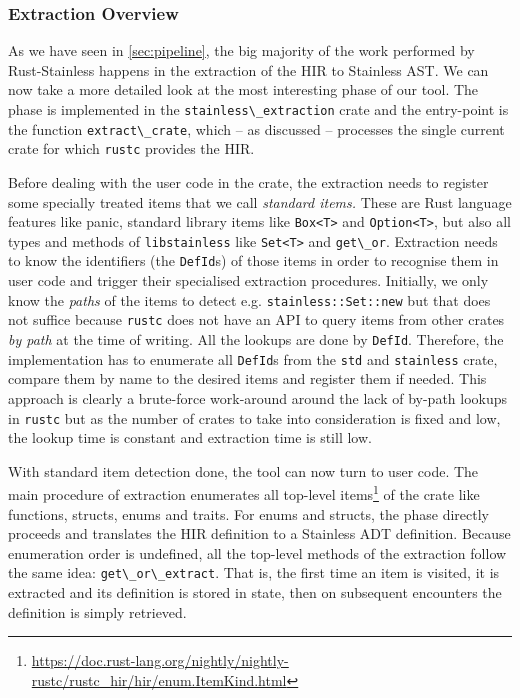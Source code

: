 \subsubsection{Extraction Overview}
\label{sec:extraction-overview}

As we have seen in \autoref{sec:pipeline}, the big majority of the work
performed by Rust-Stainless happens in the extraction of the HIR to
Stainless AST. We can now take a more detailed look at the most
interesting phase of our tool. The phase is implemented in the
\passthrough{\lstinline!stainless\_extraction!} crate and the
entry-point is the function \passthrough{\lstinline!extract\_crate!},
which -- as discussed -- processes the single current crate for which
\passthrough{\lstinline!rustc!} provides the HIR.

Before dealing with the user code in the crate, the extraction needs to
register some specially treated items that we call \emph{standard
items.} These are Rust language features like panic, standard library
items like \passthrough{\lstinline!Box<T>!} and
\passthrough{\lstinline!Option<T>!}, but also all types and methods of
\passthrough{\lstinline!libstainless!} like
\passthrough{\lstinline!Set<T>!} and \passthrough{\lstinline!get\_or!}.
Extraction needs to know the identifiers (the
\passthrough{\lstinline!DefId!}s) of those items in order to recognise
them in user code and trigger their specialised extraction procedures.
Initially, we only know the \emph{paths} of the items to detect e.g.
\passthrough{\lstinline!stainless::Set::new!} but that does not suffice
because \passthrough{\lstinline!rustc!} does not have an API to query
items from other crates \emph{by path} at the time of writing. All the
lookups are done by \passthrough{\lstinline!DefId!}. Therefore, the
implementation has to enumerate all \passthrough{\lstinline!DefId!}s
from the \passthrough{\lstinline!std!} and
\passthrough{\lstinline!stainless!} crate, compare them by name to the
desired items and register them if needed. This approach is clearly a
brute-force work-around around the lack of by-path lookups in
\passthrough{\lstinline!rustc!} but as the number of crates to take into
consideration is fixed and low, the lookup time is constant and
extraction time is still low.

With standard item detection done, the tool can now turn to user code.
The main procedure of extraction enumerates all top-level
items\footnote{\url{https://doc.rust-lang.org/nightly/nightly-rustc/rustc_hir/hir/enum.ItemKind.html}}
of the crate like functions, structs, enums and traits. For enums and
structs, the phase directly proceeds and translates the HIR definition
to a Stainless ADT definition. Because enumeration order is undefined,
all the top-level methods of the extraction follow the same idea:
\passthrough{\lstinline!get\_or\_extract!}. That is, the first time an
item is visited, it is extracted and its definition is stored in state,
then on subsequent encounters the definition is simply retrieved.

